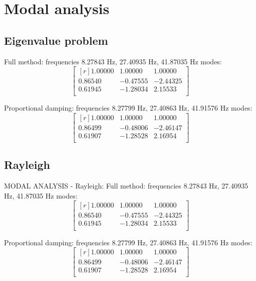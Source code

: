 \chapter{Modal analysis}
\label{chap:modalanalysis}
\section{Eigenvalue problem}
\label{sec:eigen}
Full method:
 frequencies 8.27843 \si{\hertz}, 27.40935 \si{\hertz}, 41.87035 \si{\hertz}
 modes:
\begin{equation}
\label{eq:eiegnmodefree}
 \begin{bmatrix*}[r]
 	1.00000 & 1.00000 & 1.00000 \\
	0.86540 &-0.47555 &-2.44325 \\
	0.61945 &-1.28034 & 2.15533 \\
 \end{bmatrix*}
\end{equation}

Proportional damping:
 frequencies 8.27799 \si{\hertz}, 27.40863 \si{\hertz}, 41.91576 \si{\hertz}
 modes:
\begin{equation}
\label{eq:eiegnmodeprop}
 \begin{bmatrix*}[r]
	1.00000 & 1.00000 & 1.00000 \\
	0.86499 &-0.48006 &-2.46147 \\
	0.61907 &-1.28528 & 2.16954 \\
 \end{bmatrix*}
\end{equation}
%
\section{Rayleigh}
\label{sec:ray}
MODAL ANALYSIS - Rayleigh:
Full method:
 frequencies 8.27843 \si{\hertz}, 27.40935 \si{\hertz}, 41.87035 \si{\hertz}
 modes:
 \begin{equation}
\label{eq:raymodefree}
 \begin{bmatrix*}[r]
	1.00000 & 1.00000 & 1.00000 \\
	0.86540 &-0.47555 &-2.44325 \\
	0.61945 &-1.28034 & 2.15533 \\
 \end{bmatrix*}
\end{equation}

Proportional damping:
 frequencies 8.27799 \si{\hertz}, 27.40863 \si{\hertz}, 41.91576 \si{\hertz}
 modes:
 \begin{equation}
\label{eq:raymodeprop}
 \begin{bmatrix*}[r]
	1.00000 & 1.00000 & 1.00000 \\
	0.86499 &-0.48006 &-2.46147 \\
	0.61907 &-1.28528 & 2.16954 \\
	 \end{bmatrix*}
\end{equation}
%
